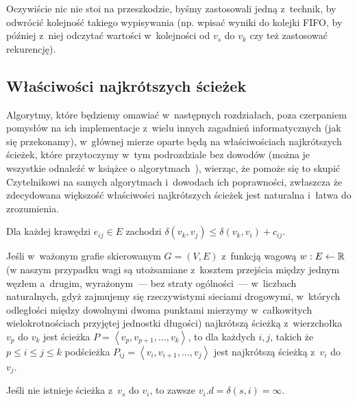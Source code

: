 Oczywiście nic nie stoi na przeszkodzie, byśmy zastosowali jedną z~technik, by odwrócić kolejność takiego wypisywania (np. wpisać wyniki do kolejki FIFO, by później z~niej odczytać wartości w~kolejności od $v_{s}$ do $v_{k}$ czy też zastosować rekurencję).



\subsection{Właściwości najkrótszych ścieżek}
\label{sub:shortestPathProperties}



Algorytmy, które będziemy omawiać w~następnych rozdziałach, poza czerpaniem pomysłów na ich implementacje z~wielu innych zagadnień informatycznych (jak się przekonamy), w~głównej mierze oparte będą na właściwościach najkrótszych ścieżek, które przytoczymy w~tym podrozdziale bez dowodów (można je wszystkie odnaleźć w książce o algorytmach~\cite[$24.5$]{Cormen}), wierząc, że pomoże się to skupić Czytelnikowi na samych algorytmach i~dowodach ich poprawności, zwłaszcza że zdecydowana większość właściwości najkrótszych ścieżek jest naturalna i~łatwa do zrozumienia.

\begin{lemma}\label{lem:triangleInequality}
	Dla każdej krawędzi $e_{ij} \in E$ zachodzi $\delta \left( v_{k}, v_{j} \right) \leqslant \delta \left( v_{k}, v_{i} \right) + c_{ij}$.
\end{lemma}

\begin{lemma}\label{lem:optimalSubstructure}
	Jeśli w~ważonym grafie skierowanym $G = \left( V, E \right)$ z~funkcją wagową $w: E \leftarrow \mathbb{R}$ (w naszym przypadku wagi są utożsamiane z~kosztem przejścia między jednym węzłem a~drugim, wyrażonym~--- bez straty ogólności~--- w~liczbach naturalnych, gdyż zajmujemy się rzeczywistymi sieciami drogowymi, w~których odległości między dowolnymi dwoma punktami mierzymy w~całkowitych wielokrotnościach przyjętej jednostki długości) najkrótszą ścieżką z~wierzchołka $v_{p}$ do $v_{k}$ jest ścieżka $P = \left \langle v_{p}, v_{p+1}, \dots, v_{k} \right \rangle$, to dla każdych $i,j$, takich że $p \leqslant i \leqslant j \leqslant k$ podścieżka $P_{ij} = \left \langle v_{i}, v_{i+1}, \dots, v_{j} \right \rangle$ jest najkrótszą ścieżką z~$v_{i}$ do $v_{j}$.
\end{lemma}

\begin{lemma}\label{lem:noPath}
	Jeśli nie istnieje ścieżka z~$v_{s}$ do $v_{i}$, to zawsze $v_{i}.d = \delta \left( s, i \right) = \infty$.
\end{lemma}

